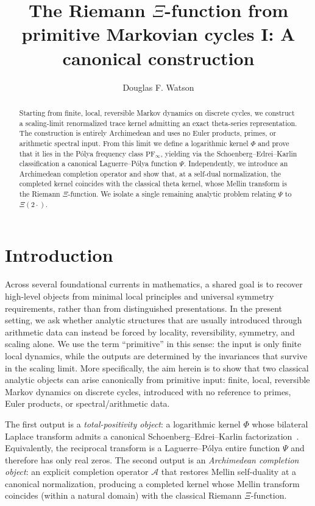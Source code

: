 \documentclass[12pt]{amsart}
\title[The Riemann $\Xi$-function from primitive Markovian cycles I]{The Riemann $\Xi$-function from primitive Markovian cycles I: A canonical construction}
\author{
Douglas F. Watson
}
\date{}
\theoremstyle{definition}
\theoremstyle{remark}
\begin{document}
\maketitle

\begin{abstract}
Starting from finite, local, reversible Markov dynamics on discrete cycles, we construct a
scaling-limit renormalized trace kernel admitting an exact theta-series representation.
The construction is entirely Archimedean and uses no Euler products, primes, or
arithmetic spectral input.
From this limit we define a logarithmic kernel $\Phi$ and prove that it lies in the
P\'olya frequency class $\mathrm{PF}_\infty$, yielding via the Schoenberg--Edrei--Karlin
classification a canonical Laguerre--P\'olya function $\Psi$.
Independently, we introduce an Archimedean completion operator and show that, at a
self-dual normalization, the completed kernel coincides with the classical theta kernel,
whose Mellin transform is the Riemann $\Xi$-function.
We isolate a single remaining analytic problem relating $\Psi$ to $\Xi(2\cdot)$.
\end{abstract}








\section{Introduction}
\label{sec:background}

Across several foundational currents in mathematics, a shared goal is to
recover high-level objects from minimal local principles and universal symmetry
requirements, rather than from distinguished presentations. In the present setting, we ask
whether analytic structures that are usually introduced through arithmetic data can instead
be forced by locality, reversibility, symmetry, and scaling alone. We use the term
``primitive'' in this sense: the input is only finite local dynamics, while the outputs are
determined by the invariances that survive in the scaling limit. More specifically, the aim herein is to show that two classical analytic objects can arise canonically
from primitive input: finite, local, reversible Markov dynamics on discrete cycles, introduced
with no reference to primes, Euler products, or spectral/arithmetic data. 

The first output is a \emph{total-positivity object}: a logarithmic kernel $\Phi$ whose
bilateral Laplace transform admits a canonical Schoenberg--Edrei--Karlin factorization~\cite{Schoenberg1951,Edrei1952,karlin1968total}.
Equivalently, the reciprocal transform is a Laguerre--P\'olya entire function $\Psi$ and
therefore has only real zeros. The second output is an \emph{Archimedean completion object}:
an explicit completion operator $\mathcal A$ that restores Mellin self-duality at a
canonical normalization, producing a completed kernel whose Mellin transform coincides
(within a natural domain) with the classical Riemann $\Xi$-function.
\end{document}
